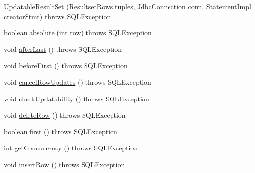 \begin{DoxyCompactItemize}
\item 
\mbox{\hyperlink{classcom_1_1mysql_1_1cj_1_1jdbc_1_1result_1_1_updatable_result_set_a1518489c8c8ca80e7c0759ce169e9477}{Updatable\+Result\+Set}} (\mbox{\hyperlink{interfacecom_1_1mysql_1_1cj_1_1protocol_1_1_resultset_rows}{Resultset\+Rows}} tuples, \mbox{\hyperlink{interfacecom_1_1mysql_1_1cj_1_1jdbc_1_1_jdbc_connection}{Jdbc\+Connection}} conn, \mbox{\hyperlink{classcom_1_1mysql_1_1cj_1_1jdbc_1_1_statement_impl}{Statement\+Impl}} creator\+Stmt)  throws S\+Q\+L\+Exception 
\item 
boolean \mbox{\hyperlink{classcom_1_1mysql_1_1cj_1_1jdbc_1_1result_1_1_updatable_result_set_a06740318948c45ed6e3309512e0375f3}{absolute}} (int row)  throws S\+Q\+L\+Exception 
\item 
void \mbox{\hyperlink{classcom_1_1mysql_1_1cj_1_1jdbc_1_1result_1_1_updatable_result_set_a3de87ab69d95977efa3a012d111bd457}{after\+Last}} ()  throws S\+Q\+L\+Exception 
\item 
void \mbox{\hyperlink{classcom_1_1mysql_1_1cj_1_1jdbc_1_1result_1_1_updatable_result_set_aa282db4f85231cebd7b2d44e8d31251d}{before\+First}} ()  throws S\+Q\+L\+Exception 
\item 
void \mbox{\hyperlink{classcom_1_1mysql_1_1cj_1_1jdbc_1_1result_1_1_updatable_result_set_a46dea298e2bb408523b0670528d5fdcb}{cancel\+Row\+Updates}} ()  throws S\+Q\+L\+Exception 
\item 
void \mbox{\hyperlink{classcom_1_1mysql_1_1cj_1_1jdbc_1_1result_1_1_updatable_result_set_a1bff404358892353e1108104b2f79084}{check\+Updatability}} ()  throws S\+Q\+L\+Exception 
\item 
void \mbox{\hyperlink{classcom_1_1mysql_1_1cj_1_1jdbc_1_1result_1_1_updatable_result_set_a8ec92a7de30ca3a13223c75a482a99c2}{delete\+Row}} ()  throws S\+Q\+L\+Exception 
\item 
boolean \mbox{\hyperlink{classcom_1_1mysql_1_1cj_1_1jdbc_1_1result_1_1_updatable_result_set_a2d4171e3aab85ff02d7e1be70ac3e7fc}{first}} ()  throws S\+Q\+L\+Exception 
\item 
int \mbox{\hyperlink{classcom_1_1mysql_1_1cj_1_1jdbc_1_1result_1_1_updatable_result_set_a96564e69aedd9768ca39b6c660012da1}{get\+Concurrency}} ()  throws S\+Q\+L\+Exception 
\item 
void \mbox{\hyperlink{classcom_1_1mysql_1_1cj_1_1jdbc_1_1result_1_1_updatable_result_set_a1ca453d586fd7bfd24d5e6fe6e7b8fe4}{insert\+Row}} ()  throws S\+Q\+L\+Exception 
\item 

\end{DoxyCompactItemize}
